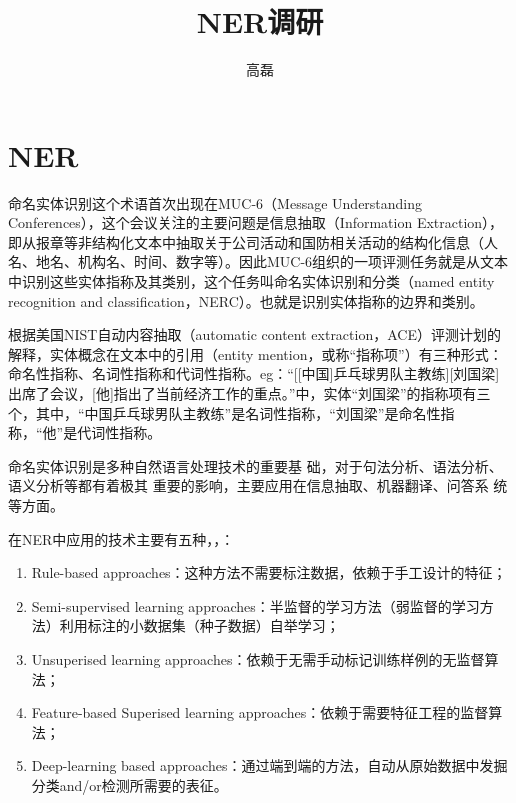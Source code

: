 \documentclass[a4paper,UTF8,no-math]{ctexart}
\title{NER调研}
\author{高磊}
\date{\zhtoday}
\begin{document}
	\tableofcontents
	
	\newpage
	
	\section{NER}
	命名实体识别这个术语首次出现在MUC-6（Message Understanding Conferences），这个会议关注的主要问题是信息抽取（Information Extraction），即从报章等非结构化文本中抽取关于公司活动和国防相关活动的结构化信息（人名、地名、机构名、时间、数字等）。因此MUC-6组织的一项评测任务就是从文本中识别这些实体指称及其类别，这个任务叫命名实体识别和分类（named entity recognition and classification，NERC）。也就是识别实体指称的边界和类别。
	
	根据美国NIST自动内容抽取（automatic content extraction，ACE）评测计划的解释，实体概念在文本中的引用（entity mention，或称“指称项”）有三种形式：命名性指称、名词性指称和代词性指称。eg：“[[中国]乒乓球男队主教练][刘国梁]出席了会议，[他]指出了当前经济工作的重点。”中，实体“刘国梁”的指称项有三个，其中，“中国乒乓球男队主教练”是名词性指称，“刘国梁”是命名性指称，“他”是代词性指称。
	
	    命名实体识别是多种自然语言处理技术的重要基
	础，对于句法分析、语法分析、语义分析等都有着极其
	重要的影响，主要应用在信息抽取、机器翻译、问答系
	统等方面。
	
	在NER中应用的技术主要有五种\citep{nadeau2007survey}，\citep{li2018survey}，\citep{宗成庆2013统计自然语言处理}：
	
	\begin{enumerate}
		\item Rule-based approaches：这种方法不需要标注数据，依赖于手工设计的特征；
		\item Semi-supervised learning approaches：半监督的学习方法（弱监督的学习方法）利用标注的小数据集（种子数据）自举学习；
		\item Unsuperised learning approaches：依赖于无需手动标记训练样例的无监督算法；
		\item Feature-based Superised learning approaches：依赖于需要特征工程的监督算法；
		\item Deep-learning based approaches：通过端到端的方法，自动从原始数据中发掘分类and/or检测所需要的表征。
	\end{enumerate}
	
\end{document}
